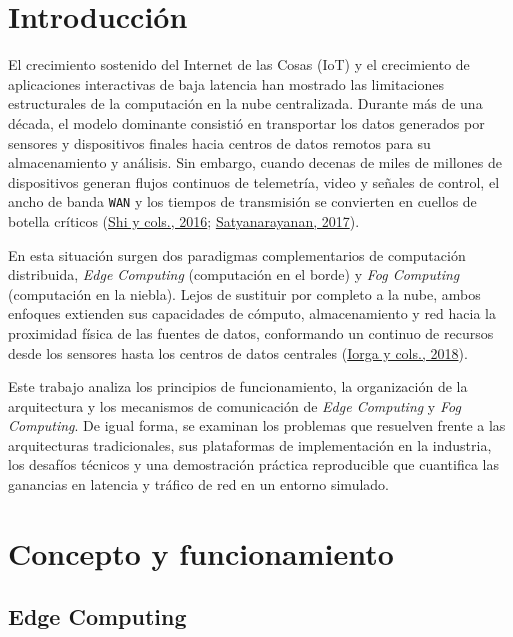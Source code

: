\documentclass[12pt, letterpaper]{article}
\begin{document}


\section{Introducción}

El crecimiento sostenido del Internet de las Cosas (IoT) y el crecimiento de aplicaciones interactivas de baja latencia han mostrado las limitaciones estructurales de la computación en la nube centralizada. Durante más de una década, el modelo dominante consistió en transportar los datos generados por sensores y dispositivos finales hacia centros de datos remotos para su almacenamiento y análisis. Sin embargo, cuando decenas de miles de millones de dispositivos generan flujos continuos de telemetría, video y señales de control, el ancho de banda \texttt{WAN} y los tiempos de transmisión se convierten en cuellos de botella críticos (\protect\hyperlink{shi2016}{Shi y cols., 2016}; \protect\hyperlink{satyanarayanan2017}{Satyanarayanan, 2017}).

En esta situación surgen dos paradigmas complementarios de computación distribuida, \textit{Edge Computing} (computación en el borde) y \textit{Fog Computing} (computación en la niebla). Lejos de sustituir por completo a la nube, ambos enfoques extienden sus capacidades de cómputo, almacenamiento y red hacia la proximidad física de las fuentes de datos, conformando un continuo de recursos desde los sensores hasta los centros de datos centrales (\protect\hyperlink{iorga2018}{Iorga y cols., 2018}).

Este trabajo analiza los principios de funcionamiento, la organización de la arquitectura y los mecanismos de comunicación de \textit{Edge Computing} y \textit{Fog Computing}. De igual forma, se examinan los problemas que resuelven frente a las arquitecturas tradicionales, sus plataformas de implementación en la industria, los desafíos técnicos y una demostración práctica reproducible que cuantifica las ganancias en latencia y tráfico de red en un entorno simulado.

\section{Concepto y funcionamiento}

\subsection{Edge Computing}
\end{document}
